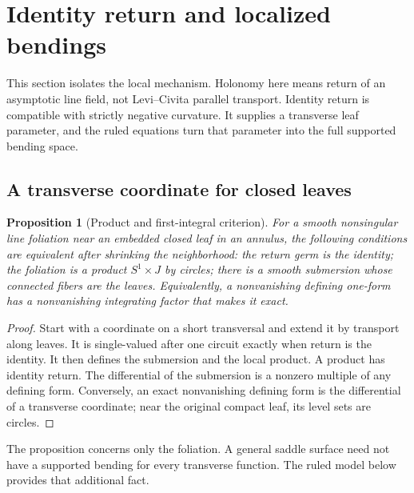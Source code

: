 \documentclass[11pt]{amsart}
\newtheorem{proposition}[theorem]{Proposition}
\theoremstyle{definition}
\theoremstyle{remark}
\numberwithin{equation}{section}
\begin{document}
\section{Identity return and localized bendings}\label{sec:theory}
\label{sec:ruled}
This section isolates the local mechanism. Holonomy here means return of
an asymptotic line field, not Levi--Civita parallel transport. Identity
return is compatible with strictly negative curvature. It supplies a
transverse leaf parameter, and the ruled equations turn that parameter
into the full supported bending space.

\subsection{A transverse coordinate for closed leaves}
\begin{proposition}[Product and first-integral criterion]\label{prop:product-holonomy}
For a smooth nonsingular line foliation near an embedded closed leaf in
an annulus, the following conditions are equivalent after shrinking the
neighborhood: the return germ is the identity; the foliation is a product
$S^1\times J$ by circles; there is a smooth submersion whose connected
fibers are the leaves. Equivalently, a nonvanishing defining one-form has
a nonvanishing integrating factor that makes it exact.
\end{proposition}
\begin{proof}
Start with a coordinate on a short transversal and extend it by transport
along leaves. It is single-valued after one circuit exactly when return
is the identity. It then defines the submersion and the local product.
A product has identity return. The differential of the submersion is a
nonzero multiple of any defining form. Conversely, an exact nonvanishing
defining form is the differential of a transverse coordinate; near the
original compact leaf, its level sets are circles.
\end{proof}
The proposition concerns only the foliation. A general saddle surface
need not have a supported bending for every transverse function. The
ruled model below provides that additional fact.
\end{document}
